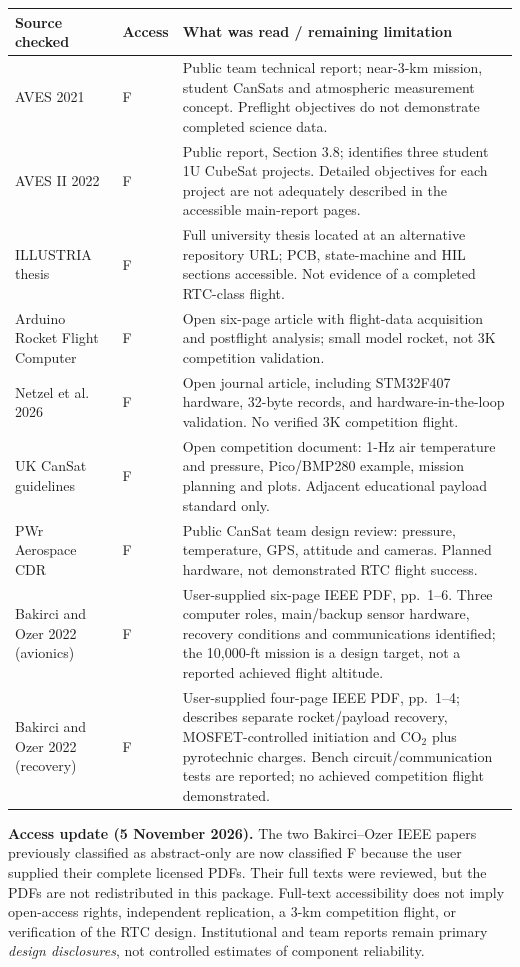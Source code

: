 \documentclass[10pt,a4paper]{article}
\begin{document}
\begin{center}\small
\begin{tabularx}{\linewidth}{@{}L{39mm}L{13mm}Y@{}}
\toprule{}\textbf{Source checked} & \textbf{Access} & \textbf{What was read / remaining limitation}\\\midrule
AVES 2021 \cite{astg2021aves} & F & Public team technical report; near-3-km mission, student CanSats and atmospheric measurement concept. Preflight objectives do not demonstrate completed science data.\\
AVES II 2022 \cite{astg2022aves2} & F & Public report, Section 3.8; identifies three student 1U CubeSat projects. Detailed objectives for each project are not adequately described in the accessible main-report pages.\\
ILLUSTRIA thesis \cite{zlamala2024} & F & Full university thesis located at an alternative repository URL; PCB, state-machine and HIL sections accessible. Not evidence of a completed RTC-class flight.\\
Arduino Rocket Flight Computer \cite{moschidis2022} & F & Open six-page article with flight-data acquisition and postflight analysis; small model rocket, not 3K competition validation.\\
Netzel et al. 2026 \cite{netzel2026} & F & Open journal article, including STM32F407 hardware, 32-byte records, and hardware-in-the-loop validation. No verified 3K competition flight.\\
UK CanSat guidelines \cite{ukcansat2024} & F & Open competition document: 1-Hz air temperature and pressure, Pico/BMP280 example, mission planning and plots. Adjacent educational payload standard only.\\
PWr Aerospace CDR \cite{pwraerospace2023} & F & Public CanSat team design review: pressure, temperature, GPS, attitude and cameras. Planned hardware, not demonstrated RTC flight success.\\
Bakirci and Ozer 2022 (avionics) \cite{bakirci2022} & F & User-supplied six-page IEEE PDF, pp.~1--6. Three computer roles, main/backup sensor hardware, recovery conditions and communications identified; the 10,000-ft mission is a design target, not a reported achieved flight altitude.\\
Bakirci and Ozer 2022 (recovery) \cite{bakirci2022recovery} & F & User-supplied four-page IEEE PDF, pp.~1--4; describes separate rocket/payload recovery, MOSFET-controlled initiation and CO$_2$ plus pyrotechnic charges. Bench circuit/communication tests are reported; no achieved competition flight demonstrated.\\
\bottomrule
\end{tabularx}
\end{center}
\textbf{Access update (5 November 2026).} The two Bakirci--Ozer IEEE papers previously classified as abstract-only are now classified F because the user supplied their complete licensed PDFs. Their full texts were reviewed, but the PDFs are not redistributed in this package. Full-text accessibility does not imply open-access rights, independent replication, a 3-km competition flight, or verification of the RTC design. Institutional and team reports remain primary \emph{design disclosures}, not controlled estimates of component reliability.
\end{document}
